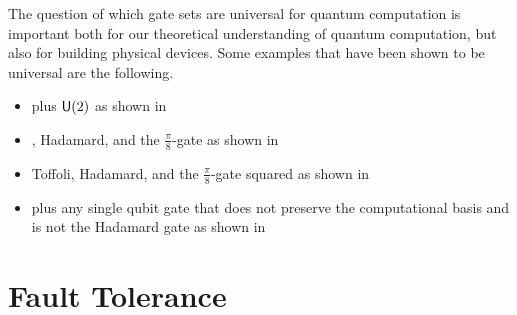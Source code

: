 The question of which gate sets are universal for quantum computation is important both for our theoretical understanding of quantum computation, but also for building physical devices.
Some examples that have been shown to be universal are the following.
\begin{itemize}
    \item \CNOT{} plus $\mathsf{U} (2)$ as shown in~\cite{universal-cnot-u2}
    \item \CNOT{}, Hadamard, and the $\frac{\pi}{8}$-gate as shown in~\cite{universal-cnot-had-p8}
    \item Toffoli, Hadamard, and the $\frac{\pi}{8}$-gate squared as shown in~\cite{bigkitaev}
    \item \CNOT{} plus any single qubit gate that does not preserve the computational basis and is not the Hadamard gate as shown in~\cite{universal-cnot-basis-change}
\end{itemize}

\section{Fault Tolerance}\label{sec:ft}

